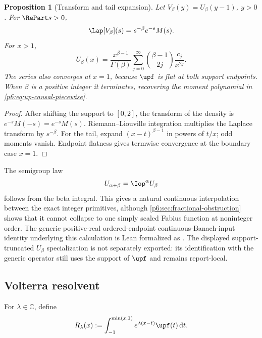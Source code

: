 \documentclass[11pt,oneside]{article}
\newtheorem{proposition}[theorem]{Proposition}
\theoremstyle{definition}
\theoremstyle{remark}
\newcommand{\C}{\mathbb C}
\newcommand{\dd}{\,\mathrm d}
\newcommand{\1}{\mathbf 1}
\begin{document}
\begin{proposition}[Transform and tail expansion]
\label{p6:prop:fractional-up-transform}
Let \(V_\beta(y)=U_\beta(y-1)\), \(y>0\).  For \(\RePart s>0\),
\begin{equation}
 \Lap[V_\beta](s)=s^{-\beta}e^{-s}M(s).                   \label{p6:eq:fractional-up-laplace}
\end{equation}
For \(x>1\),
\begin{equation}
 U_\beta(x)=\frac{x^{\beta-1}}{\Gamma(\beta)}
 \sum_{j=0}^{\infty}\binom{\beta-1}{2j}\frac{c_j}{x^{2j}}. \label{p6:eq:fractional-tail}
\end{equation}
The series also converges at \(x=1\), because \(\upf\) is flat at both support
endpoints.  When \(\beta\) is a positive integer it terminates, recovering the moment
polynomial in \eqref{p6:eq:up-causal-piecewise}.
\end{proposition}

\begin{proof}
After shifting the support to \([0,2]\), the transform of the density is
\(e^{-s}M(-s)=e^{-s}M(s)\).  Riemann--Liouville integration multiplies the Laplace
transform by \(s^{-\beta}\).  For the tail, expand
\((x-t)^{\beta-1}\) in powers of \(t/x\); odd moments vanish.  Endpoint flatness gives
termwise convergence at the boundary case \(x=1\).
\end{proof}

The semigroup law
\begin{equation}
 U_{\alpha+\beta}=\Iop^\alpha U_\beta                 \label{p6:eq:fractional-semigroup}
\end{equation}
follows from the beta integral.  This gives a natural continuous interpolation between
the exact integer primitives, although \cref{p6:sec:fractional-obstruction} shows that it
cannot collapse to one simply scaled Fabius function at noninteger order.
The generic positive-real ordered-endpoint continuous-Banach-input identity underlying this
calculation is Lean formalized as .  The displayed
support-truncated \(U_\beta\) specialization is not separately exported: its identification
with the generic operator still uses the support of \(\upf\) and remains report-local.

\subsection{Volterra resolvent}

For \(\lambda\in\C\), define
\begin{equation}
 R_\lambda(x):=\int_{-1}^{\min(x,1)}e^{\lambda(x-t)}\upf(t)\dd t. \label{p6:eq:resolvent-def}
\end{equation}
\end{document}
